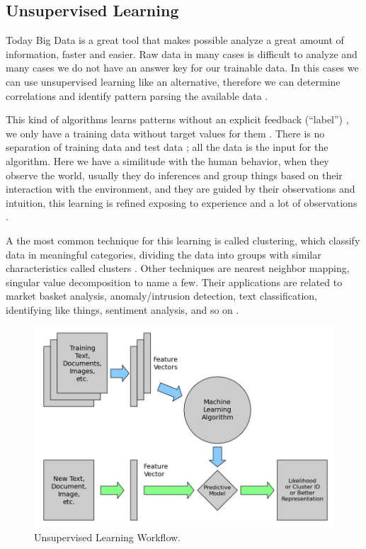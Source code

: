 \documentclass[12pt]{report}
\begin{document}
\subsection{Unsupervised Learning}

Today Big Data is a great tool that makes possible analyze a great amount of information, faster and easier.  Raw data in many cases is difficult to analyze and many cases we do not have an answer key for our trainable data. In this cases we can use unsupervised learning like an alternative, therefore we can determine correlations and identify pattern parsing the available data \cite{Nevala2017}.

This kind of algorithms learns patterns without an explicit feedback (``label'') \cite{Russell2010}, we only have a training data without target values for them \cite{Nilsson1998}. There is no separation of training data and test data \cite{Shai2014}; all the data is the input for the algorithm. Here we have a similitude with the human behavior, when they observe the world, usually they do inferences and group things based on their interaction with the environment, and they are guided by their observations and intuition, this learning is refined exposing to experience and a lot of observations \cite{Nevala2017}.

A the most common technique for this learning is called clustering, \cite{Russell2010} which classify data in meaningful categories, dividing the data into groups with similar characteristics called clusters \cite{Nilsson1998} \cite{Goodfellow2016}. Other techniques are nearest neighbor mapping, singular value decomposition to name a few. Their applications are related to market basket analysis, anomaly/intrusion detection, text classification, identifying like things, sentiment analysis, and so on \cite{Nevala2017} \cite{Halibas2018}.

\begin{figure}[H]	
	\centering
	\includegraphics[width=150mm, scale = 1]{images/2-Unsupervised_Learning.png}	
	\caption{Unsupervised Learning Workflow.}	
	\label{figure:Unsupervised_Learning}
\end{figure}
\end{document}
